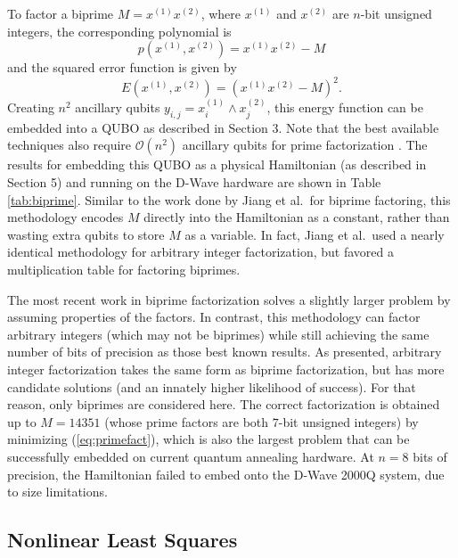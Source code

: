 To factor a biprime $M = x^{(1)}x^{(2)}$, where $x^{(1)}$ and $x^{(2)}$ are $n$-bit unsigned integers, the corresponding polynomial is 
$$
p\left(x^{(1)},x^{(2)}\right) = x^{(1)}x^{(2)} - M
$$
and the squared error function is given by
\begin{equation}
E\left(x^{(1)},x^{(2)}\right) = \left(x^{(1)}x^{(2)} - M\right)^2.
\label{eq:primefact}
\end{equation}
Creating $n^2$ ancillary qubits $y_{i,j} = x^{(1)}_i \wedge x^{(2)}_j$, this energy function can be embedded into a QUBO as described in Section 3.
Note that the best available techniques also require $\mathcal{O}(n^2)$ ancillary qubits for prime factorization \cite{dridi2017prime,jiang2018quantum,peng2008quantum}. 
The results for embedding this QUBO as a physical Hamiltonian (as described in Section 5) and running on the D-Wave hardware are shown in Table \ref{tab:biprime}.
Similar to the work done by Jiang et al.\ for biprime factoring, this methodology encodes $M$ directly into the Hamiltonian as a constant, rather than wasting extra qubits to store $M$ as a variable.
In fact, Jiang et al.\ used a nearly identical methodology for arbitrary integer factorization, but favored a multiplication table for factoring biprimes.



The most recent work in biprime factorization solves a slightly larger problem \cite{dridi2017prime,jiang2018quantum} by assuming properties of the factors.
In contrast, this methodology can factor arbitrary integers (which may not be biprimes) while still achieving the same number of bits of precision as those best known results.
As presented, arbitrary integer factorization takes the same form as biprime factorization, but has more candidate solutions (and an innately higher likelihood of success).
For that reason, only biprimes are considered here.
The correct factorization is obtained up to $M=14351$ (whose prime factors are both $7$-bit unsigned integers) by minimizing (\ref{eq:primefact}), which is also the largest problem that can be successfully embedded on current quantum annealing hardware.
At $n=8$ bits of precision, the Hamiltonian failed to embed onto the D-Wave 2000Q system, due to size limitations.

\subsection{Nonlinear Least Squares}



